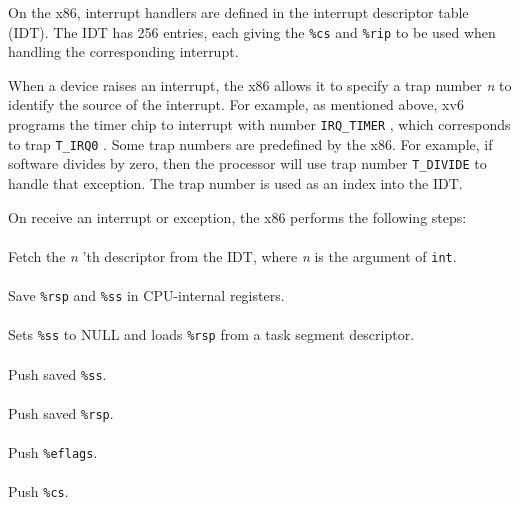 On the x86, interrupt handlers are defined in the interrupt descriptor
table (IDT). The IDT has 256 entries, each giving the
\texttt{\%cs}
and
\texttt{\%rip}
to be used when handling the corresponding interrupt.

When a device raises an interrupt, the x86 allows it to specify
a trap number
\textit{n}
to identify the source of the interrupt.  For example, as mentioned above, xv6
programs the timer chip to interrupt with number
\lstinline{IRQ_TIMER}
,
which corresponds to trap
\lstinline{T_IRQ0}
.
Some trap numbers are predefined by the x86.  For example, if software
divides by zero, then the processor will use trap number
\lstinline{T_DIVIDE}
to handle that exception.
The trap number is used as an index into the IDT.

On
receive an interrupt or exception, the x86 performs
the following steps:
\paragraph{\textbullet}Fetch the 
\textit{n} 'th
descriptor from the IDT,
where 
\textit{n}
is the argument of
\lstinline{int}.
\paragraph{\textbullet}Save
\texttt{\%rsp}
and
\texttt{\%ss}
in CPU-internal registers.
\paragraph{\textbullet}Sets
\texttt{\%ss}
to NULL and
loads
\texttt{\%rsp}
from a task segment descriptor.
\paragraph{\textbullet}Push saved
\texttt{\%ss}.
\paragraph{\textbullet}Push saved
\texttt{\%rsp}.
\paragraph{\textbullet}Push
\texttt{\%eflags}.
\paragraph{\textbullet}Push
\texttt{\%cs}.
